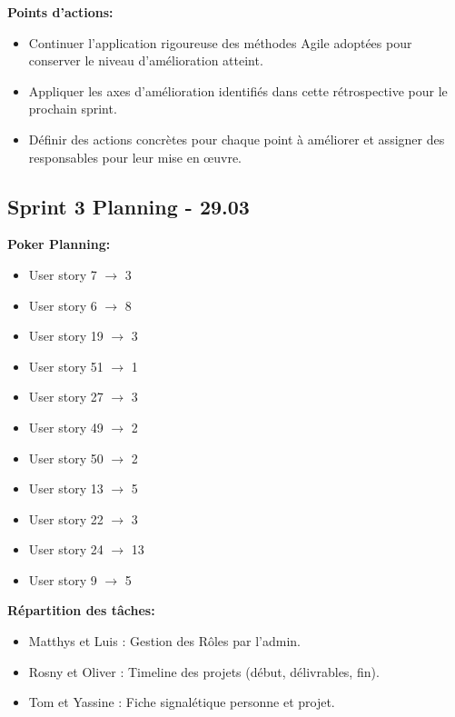 \documentclass[11pt]{article}
\begin{document}
\textbf{Points d'actions:}
\begin{itemize}
  \item Continuer l'application rigoureuse des méthodes Agile adoptées pour conserver le niveau d'amélioration atteint.
  \item Appliquer les axes d'amélioration identifiés dans cette rétrospective pour le prochain sprint.
  \item Définir des actions concrètes pour chaque point à améliorer et assigner des responsables pour leur mise en œuvre.
\end{itemize}














\subsection*{{\color{navy}Sprint 3 Planning - 29.03}}

\textbf{Poker Planning:}
\begin{itemize}
    \item User story 7 $\rightarrow$ 3
    \item User story 6 $\rightarrow$ 8
    \item User story 19 $\rightarrow$ 3
    \item User story 51 $\rightarrow$ 1
    \item User story 27 $\rightarrow$ 3
    \item User story 49 $\rightarrow$ 2
    \item User story 50 $\rightarrow$ 2
    \item User story 13 $\rightarrow$ 5
    \item User story 22 $\rightarrow$ 3
    \item User story 24 $\rightarrow$ 13
    \item User story 9 $\rightarrow$ 5
\end{itemize}

\textbf{Répartition des tâches:}
\begin{itemize}
    \item Matthys et Luis : Gestion des Rôles par l’admin.
    \item Rosny et Oliver : Timeline des projets (début, délivrables, fin).
    \item Tom et Yassine : Fiche signalétique personne et projet.
\end{itemize}
\end{document}
